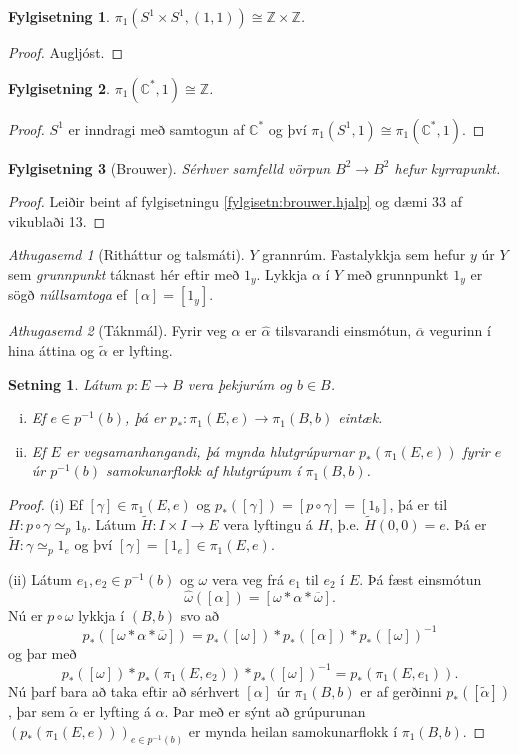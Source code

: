\documentclass[a4paper,icelandic]{book}
\theoremstyle{definition}
\theoremstyle{plain}
\newtheorem{setn}{Setning}[section]
\newtheorem{fylgisetn}{Fylgisetning}[section]
\theoremstyle{remark}
\newtheorem*{ath}{Athugasemd}
\newcommand{\Z}{\mathbb{Z}} %
\newcommand{\C}{\mathbb{C}} %
\begin{document}
\begin{fylgisetn}
  $\pi_1(S^1\times S^1,(1,1))\cong\Z\times\Z$.
\end{fylgisetn}
\begin{proof}
  Augljóst.
\end{proof}
\begin{fylgisetn}
  $\pi_1(\C^*,1)\cong\Z$.
\end{fylgisetn}
\begin{proof}
  $S^1$ er inndragi með samtogun af $\C^*$ og því
  $\pi_1(S^1,1)\cong\pi_1(\C^*,1)$.
\end{proof}
\begin{fylgisetn}
  [Brouwer]
  Sérhver samfelld vörpun $B^2\to B^2$ hefur kyrrapunkt.
\end{fylgisetn}
\begin{proof}
  Leiðir beint af fylgisetningu \ref{fylgisetn:brouwer.hjalp} og dæmi 33
  af vikublaði 13.
\end{proof}
\begin{ath}
  [Ritháttur og talsmáti]
  $Y$ grannrúm. Fastalykkja sem hefur $y$ úr $Y$ sem
  \emph{grunnpunkt} táknast hér eftir með $1_y$.
  Lykkja $\alpha$ í $Y$ með grunnpunkt $1_y$ er sögð
  \emph{núllsamtoga} ef $[\alpha]=[1_y]$.
\end{ath}
\begin{ath}
  [Táknmál]
  Fyrir veg $\alpha$ er $\hat\alpha$ tilsvarandi einsmótun,
  $\overline\alpha$ vegurinn í hina áttina og $\tilde\alpha$ er lyfting.
\end{ath}
\begin{setn}
  Látum $p:E\to B$ vera þekjurúm og $b\in B$.
  \begin{enumerate}[(i)]
    \item Ef $e\in p^{-1}(b)$, þá er $p_*:\pi_1(E,e)\to\pi_1(B,b)$
      eintæk.
    \item Ef $E$ er vegsamanhangandi, þá mynda hlutgrúpurnar
      $p_*(\pi_1(E,e))$ fyrir $e$ úr $p^{-1}(b)$ samokunarflokk af
      hlutgrúpum í $\pi_1(B,b)$. 
  \end{enumerate}
\end{setn}
\begin{proof}
  (i) Ef $[\gamma]\in\pi_1(E,e)$ og
  $p_*([\gamma])=[p\circ\gamma]=[1_b]$, þá er til
  $H:p\circ\gamma\simeq_p 1_b$. Látum $\tilde H:I\times I\to E$ vera
  lyftingu á $H$, þ.e. $\tilde H(0,0)=e$. Þá er $\tilde
  H:\gamma\simeq_p 1_e$ og því $[\gamma]=[1_e]\in\pi_1(E,e)$.


  (ii) Látum $e_1,e_2\in p^{-1}(b)$ og $\omega$ vera veg frá $e_1$ til
  $e_2$ í $E$. Þá fæst einsmótun \[
  \hat\omega([\alpha]) 
  = [\omega*\alpha*\overline\omega].
  \]
  Nú er $p\circ\omega$ lykkja í $(B,b)$ svo að \[
  p_*([\omega*\alpha*\overline\omega])
  = p_*([\omega])*p_*([\alpha])*p_*([\omega])^{-1}
  \]
  og þar með 
  \[
  p_*([\omega])*p_*(\pi_1(E,e_2))*p_*([\omega])^{-1}
  = p_*(\pi_1(E,e_1)).
  \]
  Nú þarf bara að taka eftir að sérhvert $[\alpha]$ úr $\pi_1(B,b)$ er
  af gerðinni $p_*([\tilde\alpha])$, þar sem $\tilde\alpha$ er lyfting á
  $\alpha$. Þar með er sýnt að grúpurunan $(p_*(\pi_1(E,e)))_{e\in
  p^{-1}(b)}$ er mynda heilan samokunarflokk í $\pi_1(B,b)$.
\end{proof}
\end{document}
